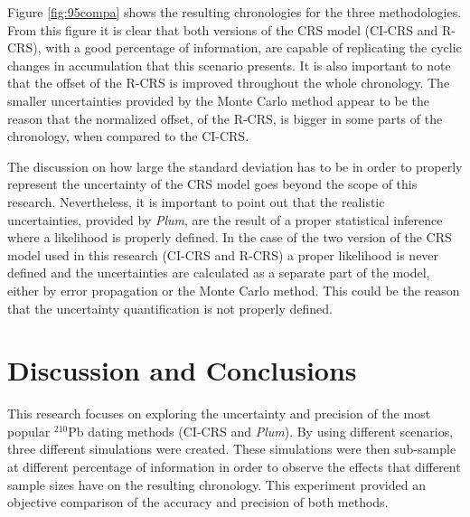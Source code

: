 \documentclass [10pt] {article}
\begin{document}
Figure \ref{fig:95compa} shows the resulting chronologies for the three methodologies.
From this figure it is clear that both versions of the CRS model (CI-CRS and R-CRS), with a good percentage of information, are capable of replicating the cyclic changes in accumulation that this scenario presents.
It is also important to note that the offset of the R-CRS is improved throughout the whole chronology. 
The smaller uncertainties provided by the Monte Carlo method \citep{Sanchez-Cabeza2014} appear to be the reason that the normalized offset, of the R-CRS, is bigger in some parts of the chronology, when compared to the CI-CRS. 

The discussion on how large the standard deviation has to be in order to properly represent the uncertainty of the CRS model goes beyond the scope of this research.
Nevertheless, it is important to point out that the realistic uncertainties, provided by \textit{Plum}, are the result of a proper statistical inference where a likelihood is properly defined.
In the case of the two version of the CRS model used in this research (CI-CRS and R-CRS) a proper likelihood is never defined and the uncertainties are calculated as a separate part of the model, either by error propagation or the Monte Carlo method.
This could be the reason that the uncertainty quantification is not properly defined.







\section{Discussion and Conclusions}

This research focuses on exploring the uncertainty and precision of the most popular $^{210}$Pb dating methods (CI-CRS and \textit{Plum}).
By using different scenarios, three different simulations were created.
These simulations were then sub-sample at different percentage of information in order to observe the effects that different sample sizes have on the resulting chronology. 
This experiment provided an objective comparison of the accuracy and precision of both methods.
\end{document}
